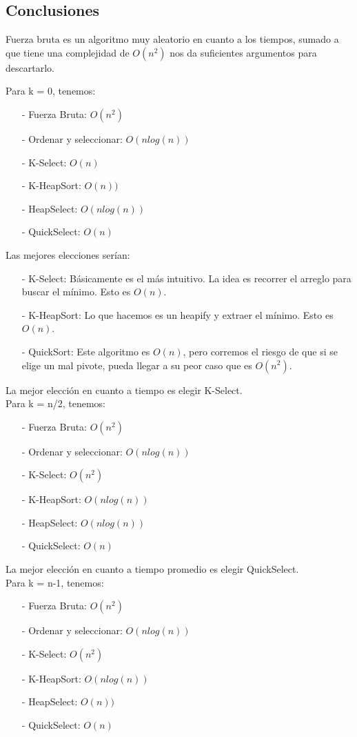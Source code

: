 \subsection{Conclusiones}
Fuerza bruta es un algoritmo muy aleatorio en cuanto a los tiempos, sumado a que tiene una complejidad de $O(n^2)$ nos da suficientes argumentos para descartarlo.

Para k = 0, tenemos:
\begin{itemize}
\item[-] Fuerza Bruta: $O(n^2)$
\item[-] Ordenar y seleccionar: $O(n log(n))$
\item[-] K-Select: $O(n)$
\item[-] K-HeapSort: $O(n))$
\item[-] HeapSelect: $O(n log(n))$
\item[-] QuickSelect: $O(n)$
\end{itemize}

Las mejores elecciones serían:
\begin{itemize}
\item[-] K-Select: Básicamente es el más intuitivo. La idea es recorrer el arreglo para buscar el mínimo. Esto es $O(n)$.
\item[-] K-HeapSort: Lo que hacemos es un heapify y extraer el mínimo. Esto es $O(n)$.
\item[-] QuickSort: Este algoritmo es $O(n)$, pero corremos el riesgo de que si se elige un mal pivote, pueda llegar a su peor caso que es $O(n^2)$.
\end{itemize}
La mejor elección en cuanto a tiempo es elegir K-Select.
\\

Para k = n/2, tenemos:
\begin{itemize}
\item[-] Fuerza Bruta: $O(n^2)$
\item[-] Ordenar y seleccionar: $O(n log(n))$
\item[-] K-Select: $O(n^2)$
\item[-] K-HeapSort: $O(n log(n))$
\item[-] HeapSelect: $O(n log(n))$
\item[-] QuickSelect: $O(n)$
\end{itemize}

La mejor elección en cuanto a tiempo promedio es elegir QuickSelect.
\\


Para k = n-1, tenemos:
\begin{itemize}
\item[-] Fuerza Bruta: $O(n^2)$
\item[-] Ordenar y seleccionar: $O(n log(n))$
\item[-] K-Select: $O(n^2)$
\item[-] K-HeapSort: $O(n log(n))$
\item[-] HeapSelect: $O(n))$
\item[-] QuickSelect: $O(n)$
\end{itemize}


